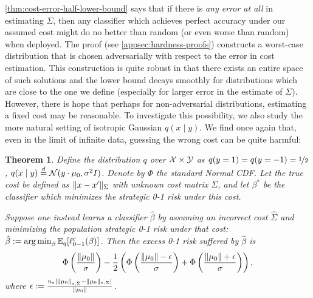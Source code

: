 \documentclass{article}
\newcommand{\costmatrix}{\Sigma}
\newcommand{\zoloss}{\ell_{0-1}}
\newcommand{\uinv}{\ensuremath{u_{*}}}
\newcommand{\psdnorm}[2]{\matrixnorm{#1}{#2}}
\newcommand{\dualpsdnorm}[2]{\psdnorm{#1}{*,#2}}
\newtheorem{theorem}{Theorem}[section]
\theoremstyle{definition}
\begin{document}
\cref{thm:cost-error-half-lower-bound} says that if there is \emph{any error at all} in estimating $\costmatrix$, then any classifier which achieves perfect accuracy under our assumed cost might do no better than random (or even worse than random) when deployed. The proof (see \cref{appsec:hardness-proofs}) constructs a worst-case distribution that is chosen adversarially with respect to the error in cost estimation. This construction is quite robust in that there exists an entire space of such solutions and the lower bound decays smoothly for distributions which are close to the one we define (especially for larger error in the estimate of $\costmatrix$). However, there is hope that perhaps for non-adversarial distributions, estimating a fixed cost may be reasonable. To investigate this possibility, we also study the more natural setting of isotropic Gaussian $q(x \mid y)$. We find once again that, even in the limit of infinite data, guessing the wrong cost can be quite harmful:
\begin{theorem}
    \label{thm:cost-error-gauss-lower-bound}
    Define the distribution $q$ over ${\mathcal{X}}\times{\mathcal{Y}}$ as $q(y=1) = q(y=-1) = \nicefrac{1}{2}$, $q(x \mid y) \overset{d}{=} \mathcal{N}(y\cdot\mu_0, \sigma^2 I)$.
    Denote by $\Phi$ the standard Normal CDF.
    Let the true cost be defined as $\psdnorm{x - x'}{\costmatrix}$ with unknown cost matrix $\costmatrix$, and let $\beta^*$ be the classifier which minimizes the strategic 0-1 risk under this cost.
    
    Suppose one instead learns a classifier $\hat\beta$ by assuming an incorrect cost $\hat\costmatrix$ and minimizing the population strategic 0-1 risk under that cost: $\hat\beta := \argmin_\beta \E_q[\zoloss^{\hat c}(\beta)]$.
     Then the excess 0-1 risk suffered by $\hat\beta$ is
    \begin{align*}
        \Phi\left( \frac{\| \mu_0 \|}{\sigma} \right) - \frac{1}{2} \left( \Phi\left( \frac{\| \mu_0 \| - \epsilon}{\sigma} \right) + \Phi\left( \frac{\| \mu_0 \| + \epsilon}{\sigma} \right)\right),
    \end{align*}
    where $\epsilon := \frac{\uinv |\dualpsdnorm{\mu_0}{\hat\costmatrix} - \dualpsdnorm{\mu_0}{\costmatrix}|}{\norm{\mu_0}}$.
\end{theorem}
\end{document}
